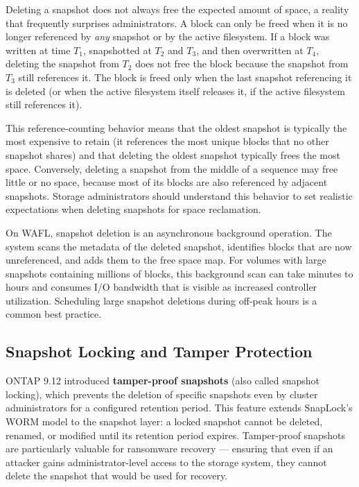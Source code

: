 Deleting a snapshot does not always free the expected amount of space, a reality that frequently surprises administrators. A block can only be freed when it is no longer referenced by \emph{any} snapshot or by the active filesystem. If a block was written at time $T_1$, snapshotted at $T_2$ and $T_3$, and then overwritten at $T_4$, deleting the snapshot from $T_2$ does not free the block because the snapshot from $T_3$ still references it. The block is freed only when the last snapshot referencing it is deleted (or when the active filesystem itself releases it, if the active filesystem still references it).

This reference-counting behavior means that the oldest snapshot is typically the most expensive to retain (it references the most unique blocks that no other snapshot shares) and that deleting the oldest snapshot typically frees the most space. Conversely, deleting a snapshot from the middle of a sequence may free little or no space, because most of its blocks are also referenced by adjacent snapshots. Storage administrators should understand this behavior to set realistic expectations when deleting snapshots for space reclamation.

On WAFL, snapshot deletion is an asynchronous background operation. The system scans the metadata of the deleted snapshot, identifies blocks that are now unreferenced, and adds them to the free space map. For volumes with large snapshots containing millions of blocks, this background scan can take minutes to hours and consumes I/O bandwidth that is visible as increased controller utilization. Scheduling large snapshot deletions during off-peak hours is a common best practice.

\subsection{Snapshot Locking and Tamper Protection}

ONTAP 9.12 introduced \textbf{tamper-proof snapshots} (also called snapshot locking), which prevents the deletion of specific snapshots even by cluster administrators for a configured retention period. This feature extends SnapLock's WORM model to the snapshot layer: a locked snapshot cannot be deleted, renamed, or modified until its retention period expires. Tamper-proof snapshots are particularly valuable for ransomware recovery --- ensuring that even if an attacker gains administrator-level access to the storage system, they cannot delete the snapshot that would be used for recovery.

